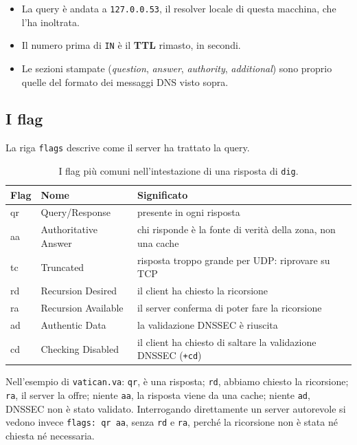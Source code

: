 \begin{itemize}
    \item La query è andata a \texttt{127.0.0.53}, il resolver locale di questa macchina, che l'ha inoltrata.
    \item Il numero prima di \texttt{IN} è il \textbf{TTL} rimasto, in secondi.
    \item Le sezioni stampate (\emph{question}, \emph{answer}, \emph{authority}, \emph{additional}) sono proprio
          quelle del formato dei messaggi DNS visto sopra.
\end{itemize}

\subsection{I flag}

La riga \texttt{flags} descrive come il server ha trattato la query.

\begin{table}[H]
\centering
\renewcommand{\arraystretch}{1.3}
\begin{tabular}{>{\ttfamily}l l p{8.2cm}}
\toprule
\normalfont\textbf{Flag} & \textbf{Nome} & \textbf{Significato} \\
\midrule
qr & Query/Response & presente in ogni risposta \\
aa & Authoritative Answer & chi risponde è la fonte di verità della zona, non una cache \\
tc & Truncated & risposta troppo grande per UDP: riprovare su TCP \\
rd & Recursion Desired & il client ha chiesto la ricorsione \\
ra & Recursion Available & il server conferma di poter fare la ricorsione \\
ad & Authentic Data & la validazione DNSSEC è riuscita \\
cd & Checking Disabled & il client ha chiesto di saltare la validazione DNSSEC (\texttt{+cd}) \\
\bottomrule
\end{tabular}
\caption{I flag più comuni nell'intestazione di una risposta di \texttt{dig}.}
\end{table}

Nell'esempio di \texttt{vatican.va}: \texttt{qr}, è una risposta; \texttt{rd}, abbiamo chiesto la ricorsione;
\texttt{ra}, il server la offre; niente \texttt{aa}, la risposta viene da una cache; niente \texttt{ad}, DNSSEC non è
stato validato. Interrogando direttamente un server autorevole si vedono invece \texttt{flags: qr aa}, senza
\texttt{rd} e \texttt{ra}, perché la ricorsione non è stata né chiesta né necessaria.

